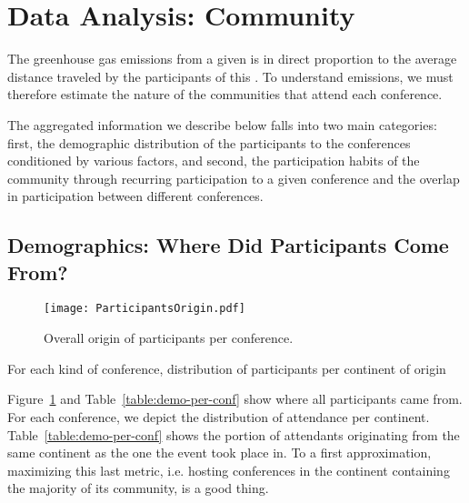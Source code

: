 \section{Data Analysis: Community}
\label{sec:community}

The greenhouse gas emissions from a given \event is in direct proportion to
the average distance traveled by the participants of this \event.
To understand emissions, we must therefore estimate the nature of the
communities that attend each conference. 

The aggregated information we describe below falls into two main categories:
first, the demographic distribution of the participants to the conferences
conditioned by various factors, and second, the participation habits of the
community through recurring participation to a given conference and the
overlap in participation between different conferences.


\subsection{Demographics: Where Did Participants Come From?}
\label{subsec:demo}

\begin{figure}
  \centering
  \texttt{[image: ParticipantsOrigin.pdf]}
  \caption{Overall origin of participants per conference.}
  \label{fig:demo-per-conf}
\end{figure}

\begin{table}
\caption{For each kind of conference, distribution of participants per continent of origin}
\label{table:demo-per-conf}
\end{table}


Figure~\ref{fig:demo-per-conf} and Table~\ref{table:demo-per-conf} show
where all participants came from. For each conference, we depict the
distribution of attendance per continent. Table~\ref{table:demo-per-conf}
shows the portion of attendants originating from the same continent as the
one the event took place in. To a first approximation, maximizing this last
metric, i.e. hosting conferences in the continent containing the majority of
its community, is a good thing.


